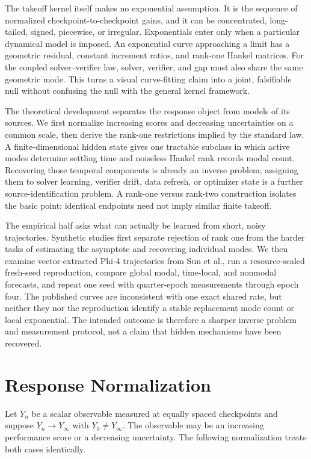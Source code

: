 \documentclass[10pt,twocolumn]{article}
\begin{document}
The takeoff kernel itself makes no exponential assumption.  It is the sequence
of normalized checkpoint-to-checkpoint gains, and it can be concentrated,
long-tailed, signed, piecewise, or irregular.  Exponentials enter only when a
particular dynamical model is imposed.  An exponential curve approaching a
limit has a geometric residual, constant increment ratios, and rank-one Hankel
matrices.  For the coupled solver--verifier law, solver, verifier, and gap must
also share the same geometric mode.  This turns a visual curve-fitting claim
into a joint, falsifiable null without confusing the null with the general
kernel framework.

The theoretical development separates the response object from models of its
sources.  We first normalize increasing scores and decreasing uncertainties on
a common scale, then derive the rank-one restrictions implied by the standard
law.  A finite-dimensional hidden state gives one tractable subclass in which
active modes determine settling time and noiseless Hankel rank records modal
count.  Recovering those temporal components is already an inverse problem;
assigning them to solver learning, verifier drift, data refresh, or optimizer
state is a further source-identification problem.  A rank-one versus rank-two
construction isolates the basic point: identical endpoints need not imply
similar finite takeoff.

The empirical half asks what can actually be learned from short, noisy
trajectories.  Synthetic studies first separate rejection of rank one from the
harder tasks of estimating the asymptote and recovering individual modes.  We
then examine vector-extracted Phi-4 trajectories from Sun et al., run a
resource-scaled fresh-seed reproduction, compare global modal, time-local, and
nonmodal forecasts, and repeat one seed with quarter-epoch measurements through
epoch four.  The published curves are inconsistent with one exact shared rate,
but neither they nor the reproduction identify a stable replacement mode count
or local exponential.  The intended outcome is therefore a sharper inverse
problem and measurement protocol, not a claim that hidden mechanisms have been
recovered.

\section{Response Normalization}

Let $Y_n$ be a scalar observable measured at equally spaced checkpoints and
suppose $Y_n\to Y_\infty$ with $Y_0\ne Y_\infty$.  The observable may be an
increasing performance score or a decreasing uncertainty.  The following
normalization treats both cases identically.
\end{document}
